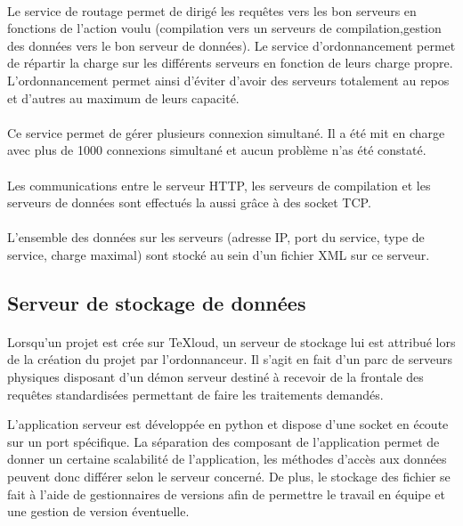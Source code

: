 \documentclass[a4paper,12pt]{article}
\begin{document}
\paragraph*{}
Le service de routage permet de dirigé les requêtes vers les bon serveurs en fonctions de l'action voulu (compilation vers un serveurs de compilation,gestion des données vers le bon serveur de données). Le service d'ordonnancement permet de répartir la charge sur les différents serveurs en fonction de leurs charge propre. L'ordonnancement permet ainsi d'éviter d'avoir des serveurs totalement au repos et d'autres au maximum de leurs capacité.

\paragraph*{}
Ce service permet de gérer plusieurs connexion simultané. Il a été mit en charge avec plus de 1000 connexions simultané et aucun problème n'as été constaté.

\paragraph*{}
Les communications entre le serveur HTTP, les serveurs de compilation et les serveurs de données sont effectués la aussi grâce à des socket TCP.

\paragraph*{}
L'ensemble des données sur les serveurs (adresse IP, port du service, type de service, charge maximal) sont stocké au sein d'un fichier XML sur ce serveur.


\subsection{Serveur de stockage de données}
\paragraph*{}
Lorsqu'un projet est crée sur TeXloud, un serveur de stockage lui est attribué lors de la création du projet par l'ordonnanceur.
Il s'agit en fait d'un parc de serveurs physiques disposant d'un démon serveur destiné à recevoir de la frontale des requêtes standardisées permettant de faire les traitements demandés.

L'application serveur est développée en python et dispose d'une socket en écoute sur un port spécifique.
La séparation des composant de l'application permet de donner un certaine scalabilité de l'application, les méthodes d'accès aux données peuvent donc différer selon le serveur concerné.
De plus, le stockage des fichier se fait à l'aide de gestionnaires de versions afin de permettre le travail en équipe et une gestion de version éventuelle.
\end{document}
